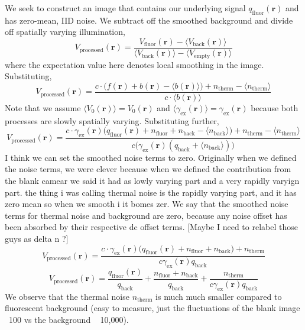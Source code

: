 We seek to construct an image that contains our underlying signal $q_{\text{fluor}}(\mathbf{r})$ and has zero-mean, IID noise. We subtract off the smoothed background and divide off spatially varying illumination,
\begin{equation}
V_{\text{processed}}(\mathbf{r})= \frac{ V_{\text{fluor}}(\mathbf{r}) - \langle V_{\text{back}}(\mathbf{r}) \rangle }{ \langle V_{\text{back}}(\mathbf{r}) \rangle - \langle V_{\text{empty}}(\mathbf{r}) \rangle}
\end{equation}
where the expectation value here denotes local smoothing in the image. Substituting,
\begin{equation}
V_{\text{processed}}(\mathbf{r})= \frac{ c \cdot \big( f(\mathbf{r})  +b(\mathbf{r}) -\langle b(\mathbf{r}) \rangle \big)+ n_{\text{therm}} - \langle n_{\text{therm}}  \rangle }{   c \cdot \langle b(\mathbf{r}) \rangle }
\end{equation}
Note that we assume $\langle V_0(\mathbf{r}) \rangle = V_0(\mathbf{r})$ and $\langle \gamma_{\text{ex}}(\mathbf{r}) \rangle  = \gamma_{\text{ex}}(\mathbf{r})$ because both processes are slowly spatially varying. Substituting further, 
\begin{equation}
V_{\text{processed}}(\mathbf{r})= \frac{ c \cdot \gamma_{\text{ex}}(\mathbf{r}) \big(  q_{\text{fluor}}(\mathbf{r}) + n_{\text{fluor}}       +   n_{\text{back}} - \langle n_{\text{back}}  \rangle  \big) + n_{\text{therm}} - \langle n_{\text{therm}}  \rangle }{     c \big( \gamma_{\text{ex}}(\mathbf{r}) ( q_{\text{back}} +  \langle n_{\text{back}} \rangle) \big) }
\end{equation}
I think we can set the smoothed noise terms to zero. Originally when we defined the noise terms, we were clever because when we defined the contribution from the blank camear we said it had as lowly varying part and a very rapidly varyign part. the thing i was calling thermal noise is the rapidly varying part, and it has zero mean so when we smooth i it bomes zer.
We say that the smoothed noise terms for thermal noise and background are zero, because any noise offset has been absorbed by their respective dc offset terms.  [Maybe I need to relabel those guys as delta n ?]
\begin{equation}
V_{\text{processed}}(\mathbf{r})= \frac{ c \cdot \gamma_{\text{ex}}(\mathbf{r}) \big(  q_{\text{fluor}}(\mathbf{r}) + n_{\text{fluor}}       +   n_{\text{back}}   \big) + n_{\text{therm}}  }{     c \gamma_{\text{ex}}(\mathbf{r})  q_{\text{back}} }
\end{equation}
\begin{equation}
V_{\text{processed}}(\mathbf{r})= \frac{ q_{\text{fluor}}(\mathbf{r}) }{ q_{\text{back}}} + \frac{n_{\text{fluor}}   +   n_{\text{back}} } {q_{\text{back}}}  + \frac{ n_{\text{therm}} }{   c \gamma_{\text{ex}}(\mathbf{r}) q_{\text{back}}} 
\end{equation}
We observe that the thermal noise $n_{\text{therm}}$ is much much smaller compared to fluorescent background (easy to measure, just the fluctuations of the blank image ~100 vs the background ~ 10,000).

